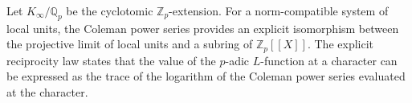 Let $K_{\infty}/\mathbb{Q}_p$ be the cyclotomic $\mathbb{Z}_p$-extension. For a norm-compatible system of local units, the Coleman power series provides an explicit isomorphism between the projective limit of local units and a subring of $\mathbb{Z}_p[[X]]$. The explicit reciprocity law states that the value of the $p$-adic $L$-function at a character can be expressed as the trace of the logarithm of the Coleman power series evaluated at the character.
